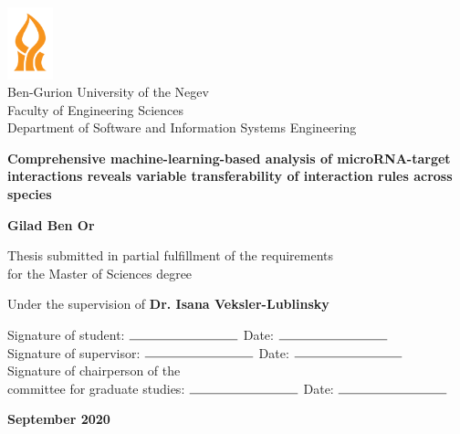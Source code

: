 \begin{titlepage}
    \begin{center}
        \vspace*{1cm}
        
        \includegraphics[width=0.1\textwidth]{bgu}\\
        Ben-Gurion University of the Negev\\
        Faculty of Engineering Sciences\\
        Department of Software and Information Systems Engineering
        
        \vspace{2cm}
        
        {\Large \textbf{Comprehensive machine-learning-based analysis of microRNA-target interactions reveals variable transferability of interaction rules across species}}
        
        
        \vspace{1.5cm}
        
        \textbf{Gilad Ben Or}
        
        \vspace{1cm}
        
        Thesis submitted in partial fulfillment of the requirements\\for the Master of Sciences degree
        
        \vspace{1cm}
        
        Under the supervision of \textbf{Dr. Isana Veksler-Lublinsky}
        
        \vspace{1cm}
        
        \begin{flushleft}
        Signature of student: \( \rule{3cm}{0.15mm} \) \hfill Date: \( \rule{3cm}{0.15mm} \)\\
        Signature of supervisor: \( \rule{3cm}{0.15mm} \) \hfill Date: \( \rule{3cm}{0.15mm} \)\\
        Signature of chairperson of the\\committee for graduate studies: \( \rule{3cm}{0.15mm} \) \hfill Date: \( \rule{3cm}{0.15mm} \)
        \end{flushleft}
        
        \vfill
        
        \textbf{September 2020}
    \end{center}
\end{titlepage}